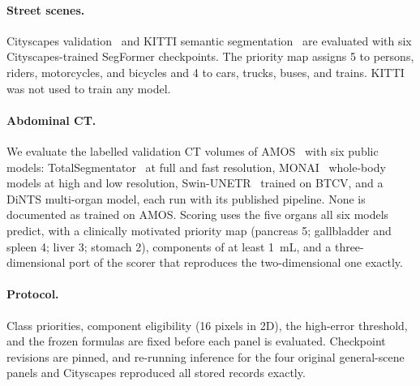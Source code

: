 \paragraph{Street scenes.} Cityscapes validation~\cite{cordts2016cityscapes} and
KITTI semantic segmentation~\cite{geiger2013kitti} are evaluated with six
Cityscapes-trained SegFormer checkpoints. The priority map assigns 5 to
persons, riders, motorcycles, and bicycles and 4 to cars, trucks, buses, and
trains. KITTI was not used to train any model.

\paragraph{Abdominal CT.} We evaluate the \NImagesAmos{} labelled validation CT
volumes of AMOS~\cite{ji2022amos} with six public models:
TotalSegmentator~\cite{wasserthal2023totalsegmentator} at full and fast
resolution, MONAI~\cite{cardoso2022monai} whole-body models at high and low
resolution, Swin-UNETR~\cite{hatamizadeh2022swinunetr} trained on BTCV, and a
DiNTS multi-organ model, each run with its published pipeline. None is
documented as trained on AMOS. Scoring uses the five organs all six models
predict, with a clinically motivated priority map (pancreas 5; gallbladder and
spleen 4; liver 3; stomach 2), components of at least 1~mL, and a
three-dimensional port of the scorer that reproduces the two-dimensional one
exactly.

\paragraph{Protocol.} Class priorities, component eligibility (16 pixels in 2D),
the high-error threshold, and the frozen formulas are fixed before each panel is
evaluated. Checkpoint revisions are pinned, and re-running inference for the
four original general-scene panels and Cityscapes reproduced all stored
records exactly.
